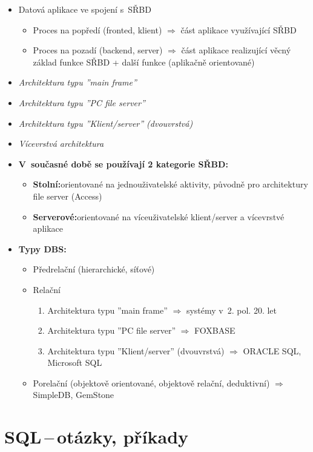 \documentclass[a4paper,10pt]{article}
\newcommand{\pojem}[2]{\item \textbf{#1:}\quad #2}
\newcommand{\tedy}{$\Rightarrow$ }
\begin{document}
				\begin{itemize}
					\item Datová aplikace ve spojení s~SŘBD
					\begin{itemize}
						\item Proces na popředí (fronted, klient) \tedy část aplikace využívající SŘBD
						\item Proces na pozadí (backend, server) \tedy část aplikace realizující věcný základ funkce SŘBD + další funkce (aplikačně orientované)
					\end{itemize}

					\item \emph{Architektura typu ''main frame''}
					\item \emph{Architektura typu ''PC file server''}
					\item \emph{Architektura typu ''Klient/server'' (dvouvrstvá)}
					\item \emph{Vícevrstvá architektura}

					\pojem{V~současné době se používají 2 kategorie SŘBD}
					\begin{itemize}
						\pojem{Stolní}{orientované na jednouživatelské aktivity, původně pro architektury file server (Access)}
						\pojem{Serverové}{orientované na víceuživatelské klient/server a vícevrstvé aplikace}
					\end{itemize}

					\pojem{Typy DBS}
					\begin{itemize}
						\item Předrelační (hierarchické, síťové)
						\item Relační
						\begin{enumerate}
							\item Architektura typu ''main frame'' \tedy systémy v~2. pol. 20. let
							\item Architektura typu ''PC file server'' \tedy FOXBASE
							\item Architektura typu ''Klient/server'' (dvouvrstvá) \tedy ORACLE SQL, Microsoft SQL
						\end{enumerate}
						\item Porelační (objektově orientované, objektově relační, deduktivní) \tedy SimpleDB, GemStone
					\end{itemize}
				\end{itemize}

	\section{SQL\,--\,otázky, příkady}
\end{document}
